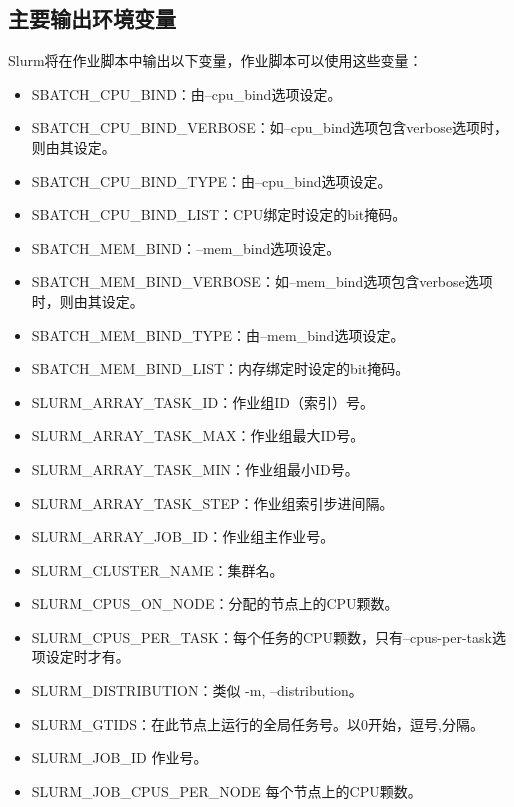 \subsection{主要输出环境变量}
Slurm将在作业脚本中输出以下变量，作业脚本可以使用这些变量：
\begin{itemize}
      \item SBATCH\_CPU\_BIND：由--cpu\_bind选项设定。
      \item SBATCH\_CPU\_BIND\_VERBOSE：如--cpu\_bind选项包含verbose选项时，则由其设定。
      \item SBATCH\_CPU\_BIND\_TYPE：由--cpu\_bind选项设定。
      \item SBATCH\_CPU\_BIND\_LIST：CPU绑定时设定的bit掩码。
      \item SBATCH\_MEM\_BIND：--mem\_bind选项设定。
      \item SBATCH\_MEM\_BIND\_VERBOSE：如--mem\_bind选项包含verbose选项时，则由其设定。
      \item SBATCH\_MEM\_BIND\_TYPE：由--mem\_bind选项设定。
      \item SBATCH\_MEM\_BIND\_LIST：内存绑定时设定的bit掩码。
      \item SLURM\_ARRAY\_TASK\_ID：作业组ID（索引）号。
      \item SLURM\_ARRAY\_TASK\_MAX：作业组最大ID号。
      \item SLURM\_ARRAY\_TASK\_MIN：作业组最小ID号。
      \item SLURM\_ARRAY\_TASK\_STEP：作业组索引步进间隔。
      \item SLURM\_ARRAY\_JOB\_ID：作业组主作业号。
      \item SLURM\_CLUSTER\_NAME：集群名。
      \item SLURM\_CPUS\_ON\_NODE：分配的节点上的CPU颗数。
      \item SLURM\_CPUS\_PER\_TASK：每个任务的CPU颗数，只有--cpus-per-task选项设定时才有。
      \item SLURM\_DISTRIBUTION：类似 -m, --distribution。
      \item SLURM\_GTIDS：在此节点上运行的全局任务号。以0开始，逗号,分隔。
      \item SLURM\_JOB\_ID 作业号。
      \item SLURM\_JOB\_CPUS\_PER\_NODE 每个节点上的CPU颗数。

\end{itemize}
